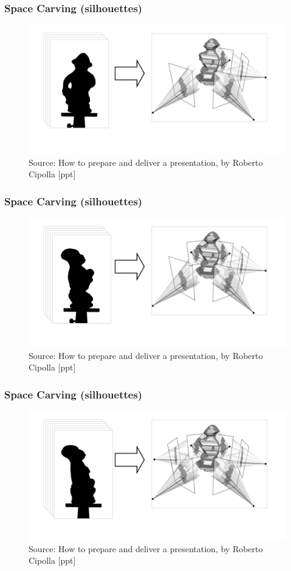 \documentclass{beamer}
\begin{document}
\begin{frame}
  \frametitle{Space Carving (silhouettes)}
  \begin{figure}[htb!]
   \centering
   \includegraphics[width=1.0\textwidth]{img/carving4}
   \caption*{\tiny Source: How to prepare and deliver a presentation, by Roberto Cipolla [ppt]}
   \label{fig:carving4}
  \end{figure}
\end{frame}
\begin{frame}
  \frametitle{Space Carving (silhouettes)}
  \begin{figure}[htb!]
   \centering
   \includegraphics[width=1.0\textwidth]{img/carving5}
   \caption*{\tiny Source: How to prepare and deliver a presentation, by Roberto Cipolla [ppt]}
   \label{fig:carving5}
  \end{figure}
\end{frame}
\begin{frame}
  \frametitle{Space Carving (silhouettes)}
  \begin{figure}[htb!]
   \centering
   \includegraphics[width=1.0\textwidth]{img/carving6}
   \caption*{\tiny Source: How to prepare and deliver a presentation, by Roberto Cipolla [ppt]}
   \label{fig:carving6}
  \end{figure}
\end{frame}
\end{document}
